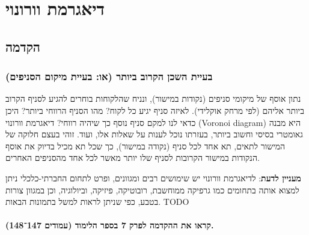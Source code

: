 \documentclass[
]{book}
\begin{document}
\hypertarget{ux5d3ux5d9ux5d0ux5d2ux5e8ux5deux5ea-ux5d5ux5d5ux5e8ux5d5ux5e0ux5d5ux5d9}{%
\chapter{דיאגרמת וורונוי}\label{ux5d3ux5d9ux5d0ux5d2ux5e8ux5deux5ea-ux5d5ux5d5ux5e8ux5d5ux5e0ux5d5ux5d9}}

\hypertarget{ux5d4ux5e7ux5d3ux5deux5d4-1}{%
\section{הקדמה}\label{ux5d4ux5e7ux5d3ux5deux5d4-1}}

\hypertarget{ux5d1ux5e2ux5d9ux5d9ux5ea-ux5d4ux5e9ux5dbux5df-ux5d4ux5e7ux5e8ux5d5ux5d1-ux5d1ux5d9ux5d5ux5eaux5e8-ux5d0ux5d5-ux5d1ux5e2ux5d9ux5d9ux5ea-ux5deux5d9ux5e7ux5d5ux5dd-ux5d4ux5e1ux5e0ux5d9ux5e4ux5d9ux5dd}{%
\subsection{בעיית השכן הקרוב ביותר (או: בעיית מיקום הסניפים)}\label{ux5d1ux5e2ux5d9ux5d9ux5ea-ux5d4ux5e9ux5dbux5df-ux5d4ux5e7ux5e8ux5d5ux5d1-ux5d1ux5d9ux5d5ux5eaux5e8-ux5d0ux5d5-ux5d1ux5e2ux5d9ux5d9ux5ea-ux5deux5d9ux5e7ux5d5ux5dd-ux5d4ux5e1ux5e0ux5d9ux5e4ux5d9ux5dd}}

נתון אוסף של מיקומי סניפים (נקודות במישור), ונניח שהלקוחות בוחרים להגיע לסניף הקרוב ביותר אליהם (לפי מרחק אוקלידי). לאיזה סניף יגיע כל לקוח? מהו הסניף הרווחי ביותר? היכן כדאי לנו למקם סניף נוסף כך שיהיה רווחי? דיאגרמת וורונוי (Voronoi diagram) היא מבנה גאומטרי בסיסי וחשוב ביותר, בעזרתו נוכל לענות על שאלות אלו, ועוד. זוהי בעצם חלוקה של המישור לתאים, תא אחד לכל סניף (נקודה במישור), כך שכל תא מכיל בדיוק את אוסף הנקודות במישור הקרובות לסניף שלו יותר מאשר לכל אחד מהסניפים האחרים.

\textbf{מעניין לדעת}: לדיאגרמת וורונוי יש שימושים רבים ומגוונים, ופרט לתחום החברתי-כלכלי ניתן למצוא אותה בתחומים כמו גרפיקה ממוחשבת, רובוטיקה, פיזיקה, וביולוגיה, וכן במגוון צורות בטבע, כפי שניתן לראות למשל בתמונות הבאות. TODO

\hypertarget{ux5e7ux5e8ux5d0ux5d5-ux5d0ux5ea-ux5d4ux5d4ux5e7ux5d3ux5deux5d4-ux5dcux5e4ux5e8ux5e7-7-ux5d1ux5e1ux5e4ux5e8-ux5d4ux5dcux5d9ux5deux5d5ux5d3-ux5e2ux5deux5d5ux5d3ux5d9ux5dd-147148.}{%
\subsubsection*{קראו את ההקדמה לפרק 7 בספר הלימוד (עמודים 147־148).}\label{ux5e7ux5e8ux5d0ux5d5-ux5d0ux5ea-ux5d4ux5d4ux5e7ux5d3ux5deux5d4-ux5dcux5e4ux5e8ux5e7-7-ux5d1ux5e1ux5e4ux5e8-ux5d4ux5dcux5d9ux5deux5d5ux5d3-ux5e2ux5deux5d5ux5d3ux5d9ux5dd-147148.}}
\end{document}
